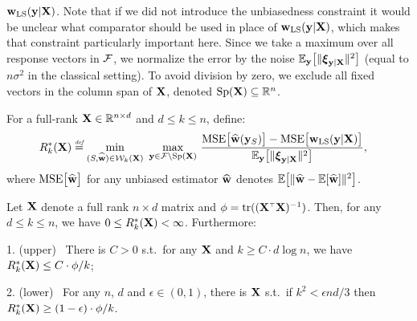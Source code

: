 \documentclass[12pt]{sty/colt2019/colt2018-arxiv}
\begin{document}
$\mathbf w_{\mathrm{LS}}(\mathbf y|\mathbf X)$. Note that if we did not introduce the unbiasedness constraint it
would be unclear what comparator should be used in place of $\mathbf w_{\mathrm{LS}}(\mathbf y|\mathbf X)$,
which makes that constraint particularly important here.
Since we take a maximum over all response vectors in $\mathcal{F}$, we
normalize the error by the noise
$\mathbb E_\mathbf y\big[\|\boldsymbol\xi_{\mathbf y|\mathbf X}\|^2\big]$ (equal to $n\sigma^2$ in the
classical setting).
To avoid division by zero, we exclude all fixed vectors in the
  column span of $\mathbf X$, denoted $\mathrm{Sp}(\mathbf X)\subseteq\mathbb R^n$.
\begin{definition}\label{d:minimax}
For a full-rank $\mathbf X\in\mathbb R^{n\times d}$ and  $d\leq k\leq n$,
define:
\begin{align*}
R_k^*(\X)&\defeq
  \min_{(S,\wbh)\in\Wc_k(\X)}\ \max_{\y\in\Fc\backslash\mathrm{Sp}(\X)}\,\frac{\mathrm{MSE}\big[\wbh(\y_S)\big]-
     \mathrm{MSE}\big[\wols(\y|\X)\big]
  }{\E_\y\big[\|\xib_{\y|\X}\|^2\big]},%
\end{align*}
where ${\mathrm{MSE}\big[\widehat{\mathbf w}\big]}$ for any unbiased estimator $\widehat{\mathbf w}$ denotes $\mathbb E\big[\|\widehat{\mathbf w}-\mathbb E[\widehat{\mathbf w}]\|^2\big]$.
\end{definition}

\begin{proposition}\label{p:minimax-bounded}
Let $\mathbf X$ denote a full rank $n\times d$ matrix and
$\phi=\tr((\X^\top\X)^{-1})$. Then, for any $d\leq k\leq n$, we have $0\leq
R_k^*(\mathbf X)<\infty$. Furthermore:

    
\textnormal{1. (upper)} \ There is $C>0$ s.t.~for any $\mathbf X$ and
$k\geq C\cdot d\log n$, we have $R_k^*(\mathbf X)\leq C\cdot \phi/k$;

\textnormal{2. (lower)} \ For any $n$, $d$ and $\epsilon\!\in\!(0,1)$, there is $\mathbf X$
    s.t.~if $k^2\!<\!\epsilon nd/3$ then $R_k^*(\mathbf X)\geq
    (1-\epsilon)\cdot\phi/k$.
  \end{proposition}
  
\end{document}
